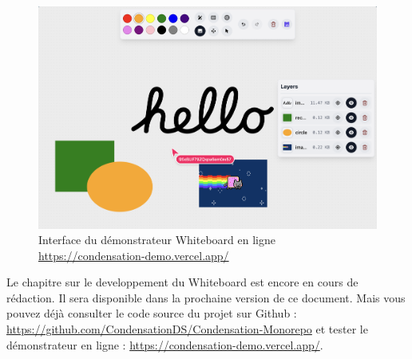 \begin{figure}[H]
    \centering
    \includegraphics[width=1\textwidth]{assets/figures/whiteboard.png}
    \caption{Interface du démonstrateur Whiteboard en ligne \url{https://condensation-demo.vercel.app/}}
    \label{fig:whiteboard}
\end{figure}

Le chapitre sur le developpement du Whiteboard est encore en cours de rédaction. Il sera disponible dans la prochaine version de ce document.
Mais vous pouvez déjà consulter le code source du projet sur Github : \url{https://github.com/CondensationDS/Condensation-Monorepo} et tester le démonstrateur en ligne : \url{https://condensation-demo.vercel.app/}.